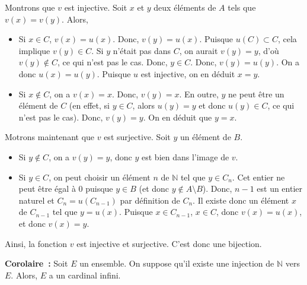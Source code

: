     Montrons que $v$ est injective. 
    Soit $x$ et $y$ deux éléments de $A$ tels que $v(x) = v(y)$. 
    Alors, 
    \begin{itemize}[nosep]
        \item Si $x \in C$, $v(x) = u(x)$. Donc, $v(y) = u(x)$. Puisque $u(C) \subset C$, cela implique $v(y) \in C$. 
            Si $y$ n'était pas dans $C$, on aurait $v(y) = y$, d'où $v(y) \notin C$, ce qui n'est pas le cas. 
            Donc, $y \in C$. 
            Donc, $v(y) = u(y)$. 
            On a donc $u(x) = u(y)$. 
            Puisque $u$ est injective, on en déduit $x = y$.
        \item Si $x \notin C$, on a $v(x) = x$. Donc, $v(y) = x$. 
            En outre, $y$ ne peut être un élément de $C$ (en effet, si $y \in C$, alors $u(y) = y$ et donc $u(y) \in C$, ce qui n'est pas le cas). 
            Donc, $v(y) = y$. 
            On en déduit que $y = x$. 
    \end{itemize}

    Motrons maintenant que $v$ est surjective. 
    Soit $y$ un élément de $B$. 
    \begin{itemize}[nosep]
        \item Si $y \notin C$, on a $v(y) = y$, donc $y$ est bien dans l'image de $v$. 
        \item Si $y \in C$, on peut choisir un élément $n$ de $\mathbb{N}$ tel que $y \in C_n$. 
            Cet entier ne peut être égal à $0$ puisque $y \in B$ (et donc $y \notin A \setminus B$). 
            Donc, $n-1$ est un entier naturel et $C_n = u(C_{n-1})$ par définition de $C_n$. 
            Il existe donc un élément $x$ de $C_{n-1}$ tel que $y = u(x)$. 
            Puisque $x \in C_{n-1}$, $x \in C$, donc $v(x) = u(x)$, et donc $v(x) = y$. 
    \end{itemize}

    Ainsi, la fonction $v$ est injective et surjective. 
    C'est donc une bijection.

   \done 

\medskip

\noindent\textbf{Corolaire :} Soit $E$ un ensemble. On suppose qu'il existe une injection de $\mathbb{N}$ vers $E$. 
    Alors, $E$ a un cardinal infini.

\medskip

